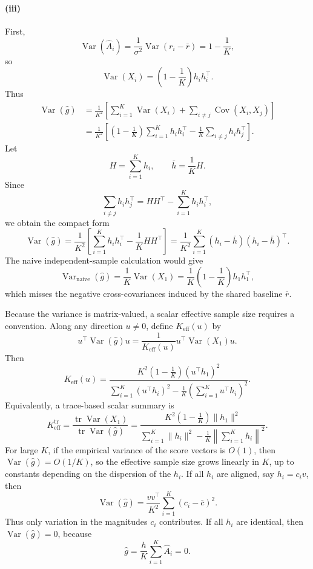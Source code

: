 \paragraph{(iii)}
First,
\[
\operatorname{Var}(\hat A_i)
=
\frac{1}{\sigma^2}\operatorname{Var}(r_i-\bar r)
=
1-\frac{1}{K},
\]
so
\[
\operatorname{Var}(X_i)
=
\left(1-\frac{1}{K}\right)h_i h_i^\top .
\]
Thus
\begin{align}
\operatorname{Var}(\hat g)
&=
\frac{1}{K^2}
\left[
\sum_{i=1}^K \operatorname{Var}(X_i)
+
\sum_{i\neq j}\operatorname{Cov}(X_i,X_j)
\right]  \\
&=
\frac{1}{K^2}
\left[
\left(1-\frac{1}{K}\right)\sum_{i=1}^K h_i h_i^\top
-
\frac{1}{K}\sum_{i\neq j}h_i h_j^\top
\right].
\end{align}
Let
\[
H=\sum_{i=1}^K h_i,
\qquad
\bar h=\frac{1}{K}H.
\]
Since
\[
\sum_{i\neq j}h_i h_j^\top
=
HH^\top-\sum_{i=1}^K h_i h_i^\top,
\]
we obtain the compact form
\[
\boxed{
\operatorname{Var}(\hat g)
=
\frac{1}{K^2}
\left[
\sum_{i=1}^K h_i h_i^\top
-
\frac{1}{K}HH^\top
\right]
=
\frac{1}{K^2}
\sum_{i=1}^K (h_i-\bar h)(h_i-\bar h)^\top .
}
\]
The naive independent-sample calculation would give
\[
\operatorname{Var}_{\mathrm{naive}}(\hat g)
=
\frac{1}{K}\operatorname{Var}(X_1)
=
\frac{1}{K}\left(1-\frac{1}{K}\right)h_1h_1^\top ,
\]
which misses the negative cross-covariances induced by the shared baseline
\(\bar r\).

Because the variance is matrix-valued, a scalar effective sample size requires a
convention. Along any direction \(u\neq 0\), define \(K_{\mathrm{eff}}(u)\) by
\[
u^\top \operatorname{Var}(\hat g)u
=
\frac{1}{K_{\mathrm{eff}}(u)}
u^\top \operatorname{Var}(X_1)u .
\]
Then
\[
\boxed{
K_{\mathrm{eff}}(u)
=
\frac{
K^2\left(1-\frac{1}{K}\right)(u^\top h_1)^2
}{
\sum_{i=1}^K (u^\top h_i)^2
-
\frac{1}{K}\left(\sum_{i=1}^K u^\top h_i\right)^2
}.
}
\]
Equivalently, a trace-based scalar summary is
\[
K_{\mathrm{eff}}^{\mathrm{tr}}
=
\frac{
\operatorname{tr}\operatorname{Var}(X_1)
}{
\operatorname{tr}\operatorname{Var}(\hat g)
}
=
\frac{
K^2\left(1-\frac{1}{K}\right)\|h_1\|^2
}{
\sum_{i=1}^K \|h_i\|^2
-
\frac{1}{K}\left\|\sum_{i=1}^K h_i\right\|^2
}.
\]
For large \(K\), if the empirical variance of the score vectors is \(O(1)\),
then \(\operatorname{Var}(\hat g)=O(1/K)\), so the effective sample size grows
linearly in \(K\), up to constants depending on the dispersion of the \(h_i\).
If all \(h_i\) are aligned, say \(h_i=c_i v\), then
\[
\operatorname{Var}(\hat g)
=
\frac{vv^\top}{K^2}\sum_{i=1}^K (c_i-\bar c)^2.
\]
Thus only variation in the magnitudes \(c_i\) contributes. If all \(h_i\) are
identical, then \(\operatorname{Var}(\hat g)=0\), because
\[
\hat g
=
\frac{h}{K}\sum_{i=1}^K \hat A_i
=
0.
\]

